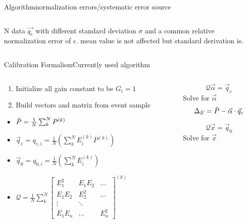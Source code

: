 \documentclass[aspectratio=169,xcolor=dvipsnames]{beamer}
\begin{document}
\begin{frame}{Algorithm}{normalization errors/systematic error source}
\begin{columns}
\begin{column}{0.5\textwidth}
N data $\vec{q_e}$ with different standard deviation $\sigma$ and a common relative normalization error of $\epsilon$. mean value is not affected but standard derivation is. 
\end{column}
\end{columns}
\end{frame}{}
\begin{frame}{Calibration Formalism}{Currently used algorithm}
  \smaller
  \begin{columns}
    \begin{column}{0.5\textwidth}
      \begin{enumerate}
        \item Initialize all gain constant to be $ G_i = 1$
        \item Build vectors and matrix from event sample
      \end{enumerate}

      \begin{itemize}
        \item $\Bar{P} = \frac{1}{N}\sum^N_k P^{(k)}$
        \item $\vec{q} _e = q_{e,i}= \frac{1}{N}(\sum^N_k E_i^{(k)} P^{(k)})$
        \item $\vec{q}_0 = q_{0,i}= \frac{1}{N}(\sum^N_k E_i^{(k)})$
        \item 
          {\smaller
      \(
        \mathcal{Q}=\frac{1}{N} \sum^N_k
        \begin{bmatrix}
          E_1^2 &  E_1E_2 & \dots \\
          E_1E_2 &  E_2^2 & \dots \\
          \vdots & \ddots & \\
          E_1E_{n}&\dots &  E^2_{n}
        \end{bmatrix}^{(k)}
      \)
    }
      \end{itemize}
      \end{column}
    \begin{column}{0.5\textwidth}

      \[
        \mathcal{Q} \vec{\alpha} = \vec{q}_e
      \]
      Solve for $\vec{\alpha}$
      \[
        \Delta_E  = \Bar{P} - \vec{\alpha}\cdot \vec{q}_e
      \]

      \[
        \mathcal{Q} \vec{x} = \vec{q}_0
      \]
      Solve for $\vec{x}$


\end{column}
\end{columns}
\end{frame}
\end{document}
